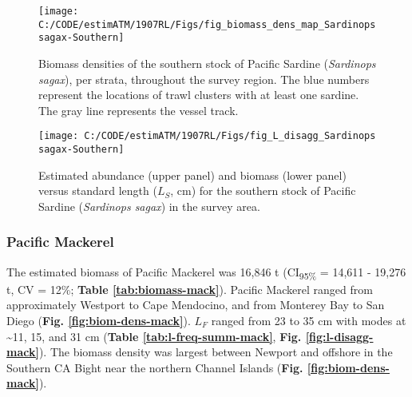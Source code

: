\documentclass[]{article}
\begin{document}
\begin{figure}[H]

{\centering \texttt{[image: C:/CODE/estimATM/1907RL/Figs/fig\_biomass\_dens\_map\_Sardinops sagax-Southern]} 

}

\caption{Biomass densities of the southern stock of Pacific Sardine (\emph{Sardinops sagax}), per strata, throughout the survey region. The blue numbers represent the locations of trawl clusters with at least one sardine. The gray line represents the vessel track.}\label{fig:biom-dens-sar-s}
\end{figure}

\newpage



\begin{figure}[H]

{\centering \texttt{[image: C:/CODE/estimATM/1907RL/Figs/fig\_L\_disagg\_Sardinops sagax-Southern]} 

}

\caption{Estimated abundance (upper panel) and biomass (lower panel) versus standard length (\(L_S\), cm) for the southern stock of Pacific Sardine (\emph{Sardinops sagax}) in the survey area.}\label{fig:l-disagg-sar-s}
\end{figure}

\newpage

\hypertarget{results-mack}{%
\subsubsection{Pacific Mackerel}\label{results-mack}}

The estimated biomass of Pacific Mackerel was 16,846 t (CI\textsubscript{95\%} = 14,611 - 19,276 t, CV = 12\%; \textbf{Table \ref{tab:biomass-mack}}). Pacific Mackerel ranged from approximately Westport to Cape Mendocino, and from Monterey Bay to San Diego (\textbf{Fig. \ref{fig:biom-dens-mack}}). \(L_F\) ranged from 23 to 35 cm with modes at \textasciitilde11, 15, and 31 cm (\textbf{Table \ref{tab:l-freq-summ-mack}}, \textbf{Fig. \ref{fig:l-disagg-mack}}). The biomass density was largest between Newport and offshore in the Southern CA Bight near the northern Channel Islands (\textbf{Fig. \ref{fig:biom-dens-mack}}).
\end{document}
